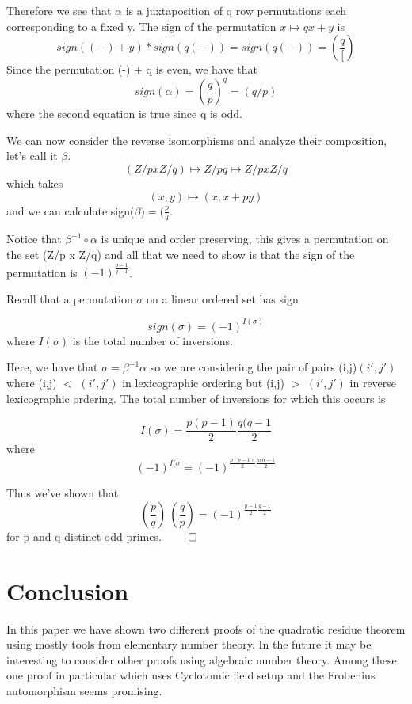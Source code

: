 \documentclass{article}
\begin{document}
\begin{spacing}{1.1}
Therefore we see that $\alpha$ is a juxtaposition of q row permutations each corresponding to a fixed y.  The sign of the permutation $x \mapsto qx + y$ is
$$ sign((-) + y) * sign(q(-)) = sign(q(-))=(\frac{q}{[})
$$
Since the permutation (-) + q is even, we have that 
$$sign(\alpha) = (\frac{q}{p})^q = (q/p)$$
where the second equation is true since q is odd.  

\vspace{3mm}

We can now consider the reverse isomorphisms and analyze their composition, let's call it $\beta$.  
$$(Z/p x Z/q) \mapsto Z/pq \mapsto Z/p x Z/q$$
which takes
$$(x,y) \mapsto (x,x+py)$$
and we can calculate sign($\beta) = (\frac{p}{q}$.  

Notice that $\beta^{-1} \circ \alpha$ is unique and order preserving, this gives a permutation on the set (Z/p x Z/q) and all that we need to show is that the sign of the permutation is $(-1)^{\frac{p-1}{q-1}}$.  

\vspace{3mm}

Recall that a permutation $\sigma$ on a linear ordered set has sign

$$ sign(\sigma) = (-1)^{I(\sigma)}$$ where $I(\sigma)$ is the total number of inversions.  

Here, we have that $\sigma = \beta^{-1}\alpha$ so we are considering the pair of pairs (i,j)$(i\prime,j\prime)$ where (i,j) $<$ $(i\prime,j\prime)$ in lexicographic ordering but (i,j) $>$ $(i\prime,j\prime)$ in reverse lexicographic ordering.  The total number of inversions for which this occurs is

$$ I(\sigma) = \frac{p(p-1)}{2}\frac{q(q-1}{2} $$
where 
$$ (-1)^{I(\sigma} = (-1)^{\frac{p(p-1)}{2}\frac{n(n-1}{2}}$$  

Thus we've shown that $$
(\frac{p}{q}) \ (\frac{q}{p}) = (-1)^{\frac{p-1}{2}\frac{q-1}{2}}
$$ for p and q distinct odd primes.  $\qed$

\section{Conclusion}

In this paper we have shown two different proofs of the quadratic residue theorem using mostly tools from elementary number theory.  In the future it may be interesting to consider other proofs using algebraic number theory.  Among these one proof in particular which uses Cyclotomic field setup and the Frobenius automorphism seems promising.  


\end{spacing}
\end{document}
